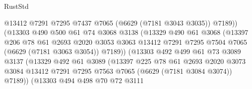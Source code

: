 \begin{lexlean}{RustStd}
\begin{coremodule}
                                @13412
                                @7291
                                @7295
                                @7437
                                @7065
                                (@6629 (@7181 @3043 @3035))
                                @7189))
                            (@13303
                              @490
                              @500
                              @61
                              @74
                              @3068
                              @3138
                              (@13329
                                @490
                                @61
                                @3068
                                (@13397
                                  @206
                                  @78
                                  @61
                                  @2693
                                  @2020
                                  @3053
                                  @3063
                                  @13412
                                  @7291
                                  @7295
                                  @7504
                                  @7065
                                  (@6629 (@7181 @3063 @3054))
                                  @7189))
                              (@13303
                                @492
                                @499
                                @61
                                @73
                                @3089
                                @3137
                                (@13329
                                  @492
                                  @61
                                  @3089
                                  (@13397
                                    @225
                                    @78
                                    @61
                                    @2693
                                    @2020
                                    @3073
                                    @3084
                                    @13412
                                    @7291
                                    @7295
                                    @7563
                                    @7065
                                    (@6629 (@7181 @3084 @3074))
                                    @7189))
                                (@13303
                                  @494
                                  @498
                                  @70
                                  @72
                                  @3111

\end{coremodule}
\end{lexlean}
